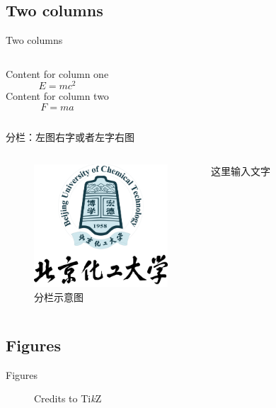 \documentclass[
10pt,
aspectratio=169,
]{beamer}
\begin{document}
\subsection{Two columns}
\begin{frame}[c]{Two columns}
	
\begin{columns}[onlytextwidth]
	Content for column one
	\begin{equation}
	E = mc^2
	\end{equation}
	Content for column two
	\begin{equation}
	F=ma
	\end{equation}
\end{columns}
\end{frame}	

\begin{frame}{分栏：左图右字或者左字右图}
\begin{columns}
		\begin{figure}
		\centering
		\includegraphics[width=5cm]{logo}
		\caption{分栏示意图}
	\end{figure}
	\small
	这里输入文字
\end{columns}
\end{frame}


\subsection{Figures}
\begin{frame}[c]{Figures}
	\begin{figure}
		\centering
		\caption{Credits to Ti\textit{k}Z}
	\end{figure}
\end{frame}	
\end{document}
